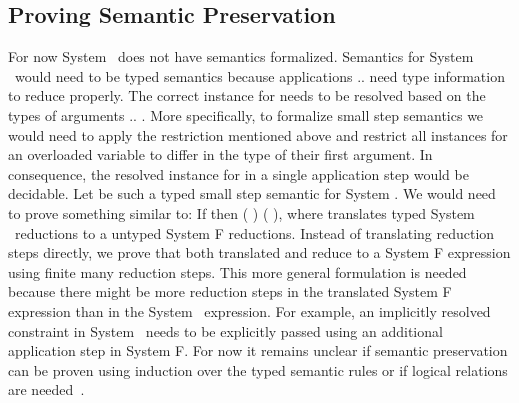 \subsection{Proving Semantic Preservation }
For now System \Fo\ does not have semantics formalized.
Semantics for System \Fo\ would need to be typed semantics because applications     $..$   need type information to reduce properly.
The correct instance for  needs to be resolved based on the types of arguments  $..$ . 
More specifically, to formalize small step semantics we would need to apply the restriction mentioned above and restrict all instances for an overloaded variable  to differ in the type of their first argument. In consequence, the resolved instance for  in a single application step     would be decidable.
Let    be such a typed small step semantic for System \Fo. We would need to prove something similar to: If    then  \Constr{[}  \Constr{]} (   )  (   ), where  translates typed System \Fo\ reductions to a untyped System F reductions.
Instead of translating reduction steps directly, we prove that both translated  and  reduce to a System F expression  using finite many reduction steps.
This more general formulation is needed because there might be more reduction steps in the translated System F expression than in the System \Fo\ expression. 
For example, an implicitly resolved constraint in System \Fo\ needs to be explicitly passed using an additional application step in System F. 
For now it remains unclear if semantic preservation can be proven using induction over the typed semantic rules or if logical relations are needed~\cite{logrel}.

